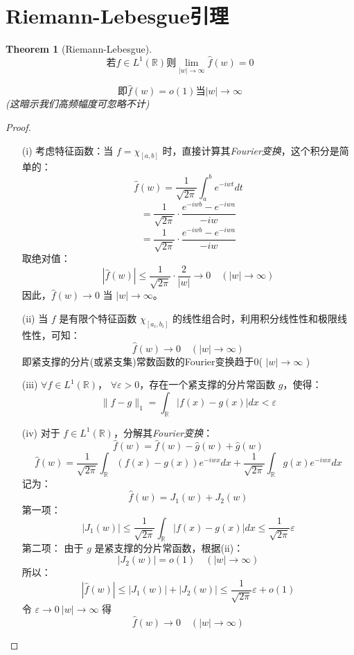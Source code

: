 \documentclass[linespread=1.5,openany]{book}%
\theoremstyle{plain}
\newtheorem{theorem}{Theorem}
\begin{document}
{{				\section{Riemann-Lebesgue引理}
				\begin{theorem}[Riemann-Lebesgue]\label{4.2.riemann-lebesgue}
					\[	\text{若}f \in L^1(\mathbb{R})\text{则}\lim_{|w| \to \infty} \hat{f}(w) = 0\]
					\begin{center} \[ 
						\text{即}\hat{f}(w)=o(1) 	\text{当}|w| \to \infty \](这暗示我们高频幅度可忽略不计)\end{center}
				\end{theorem}
				\begin{proof}
					\begin{itemize}
						\item[(i)] 考虑特征函数：当 \( f = \chi_{[a, b]} \) 时，直接计算其\emph{Fourier变换}，这个积分是简单的：
						\[
						\hat{f}(w) = \frac{1}{\sqrt{2\pi}} \int_{a}^{b} e^{-i w t} dt
						\]
						\[= \frac{1}{\sqrt{2\pi}} \cdot \frac{e^{-i w b} - e^{-i w a}}{-i w}
						\]
						\[= \frac{1}{\sqrt{2\pi}} \cdot \frac{e^{-i w b} - e^{-i w a}}{-i w}
						\]
						取绝对值：
						\[
						|\hat{f}(w)| \leq \frac{1}{\sqrt{2\pi}} \cdot \frac{2}{|w|} \to 0 \quad (|w| \to \infty)
						\]
						因此，\( \hat{f}(w) \to 0 \) 当 \( |w| \to \infty \)。
						
						\item [(ii)] 当 \( f \) 是有限个特征函数 \( \chi_{[a_i, b_i]} \) 的线性组合时，利用积分线性性和极限线性性，可知：
						\[
						\hat{f}(w) \to 0 \quad (|w| \to \infty)
						\]
						即紧支撑的分片(或紧支集)常数函数的Fourier变换趋于0( \( |w| \to \infty \) )
						
						\item [(iii)]  \(\forall f \in L^1(\mathbb{R}) \)， \(\forall \varepsilon > 0 \)，存在一个紧支撑的分片常函数 \( g \)，使得：
						\[
						\|f - g\|_1 = \int_{\mathbb{R}} |f(x) - g(x)| dx < \varepsilon
						\]
						
						\item [(iv)]对于 \( f \in L^1(\mathbb{R}) \)，分解其\emph{Fourier变换}：
						\[
						\hat{f}(w) = \hat{f}(w) - \hat{g}(w) + \hat{g}(w)
						\]
						\[
						\hat{f}(w) = \frac{1}{\sqrt{2\pi}} \int_{\mathbb{R}} (f(x) - g(x)) e^{-i w x} dx + \frac{1}{\sqrt{2\pi}} \int_{\mathbb{R}} g(x) e^{-i w x} dx
						\]
						记为：
						\[
						\hat{f}(w) = J_1(w) + J_2(w)
						\]
						第一项：	
						\[
						|J_1(w)| \leq \frac{1}{\sqrt{2\pi}} \int_{\mathbb{R}} |f(x) - g(x)| dx \leq \frac{1}{\sqrt{2\pi}} \varepsilon
						\]
						第二项：
						由于 \( g \) 是紧支撑的分片常函数，根据(ii)：
						\[|J_2(w)| = o(1) \quad (|w| \to \infty)\]
						所以：\[
						|\hat{f}(w)| \leq |J_1(w)| + |J_2(w)| \leq \frac{1}{\sqrt{2\pi}} \varepsilon + o(1)
						\]	
						令 \( \varepsilon \to 0 \  |w| \to \infty  \) 得
						\[
						\hat{f}(w) \to 0 \quad (|w| \to \infty)
						\]	\end{itemize}
				\end{proof}
}}
\end{document}
